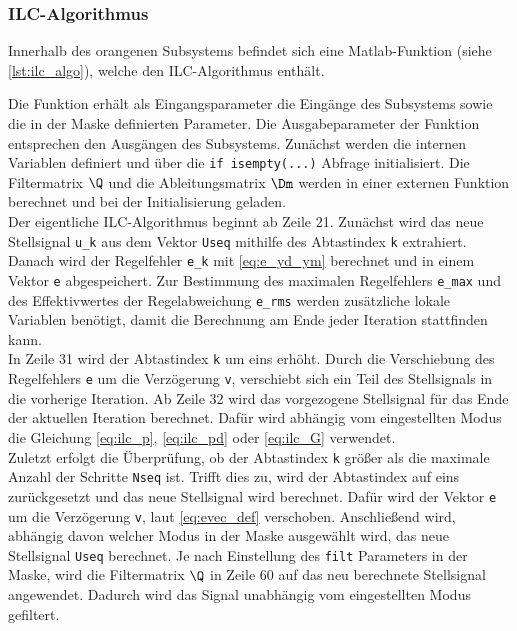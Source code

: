 \subsubsection{ILC-Algorithmus}
Innerhalb des orangenen Subsystems befindet sich eine Matlab-Funktion (siehe \autoref{lst:ilc_algo}), welche den ILC-Algorithmus enthält. 

Die Funktion erhält als Eingangsparameter die Eingänge des Subsystems sowie die in der Maske definierten Parameter. Die Ausgabeparameter der Funktion entsprechen den Ausgängen des Subsystems. Zunächst werden die internen Variablen definiert und über die \lstinline{if isempty(...)} Abfrage initialisiert. Die Filtermatrix $\Q$ und die Ableitungsmatrix $\Dm$ werden in einer externen Funktion berechnet und bei der Initialisierung geladen. \\
Der eigentliche ILC-Algorithmus beginnt ab Zeile 21. Zunächst wird das neue Stellsignal \lstinline{u_k} aus dem Vektor \lstinline{Useq} mithilfe des Abtastindex \lstinline{k} extrahiert. Danach wird der Regelfehler \lstinline{e_k} mit \autoref{eq:e_yd_ym} berechnet und in einem Vektor \lstinline{e} abgespeichert. Zur Bestimmung des maximalen Regelfehlers \lstinline{e_max} und des Effektivwertes der Regelabweichung \lstinline{e_rms} werden zusätzliche lokale Variablen benötigt, damit die Berechnung am Ende jeder Iteration stattfinden kann.\\
In Zeile 31 wird der Abtastindex \lstinline{k} um eins erhöht. Durch die Verschiebung des Regelfehlers \lstinline{e} um die Verzögerung \lstinline{v}, verschiebt sich ein Teil des Stellsignals in die vorherige Iteration. Ab Zeile 32 wird das vorgezogene Stellsignal für das Ende der aktuellen Iteration berechnet. Dafür wird abhängig vom eingestellten Modus die Gleichung \ref{eq:ilc_p}, \ref{eq:ilc_pd} oder \ref{eq:ilc_G} verwendet.\\
Zuletzt erfolgt die Überprüfung, ob der Abtastindex \lstinline{k} größer als die maximale Anzahl der Schritte \lstinline{Nseq} ist. Trifft dies zu, wird der Abtastindex auf eins zurückgesetzt und das neue Stellsignal wird berechnet. Dafür wird der Vektor \lstinline{e} um die Verzögerung \lstinline{v}, laut \autoref{eq:evec_def} verschoben. Anschließend wird, abhängig davon welcher Modus in der Maske ausgewählt wird, das neue Stellsignal \lstinline{Useq} berechnet. Je nach Einstellung des \lstinline{filt} Parameters in der Maske, wird die Filtermatrix $\Q$ in Zeile 60 auf das neu berechnete Stellsignal angewendet. Dadurch wird das Signal unabhängig vom eingestellten Modus gefiltert.

